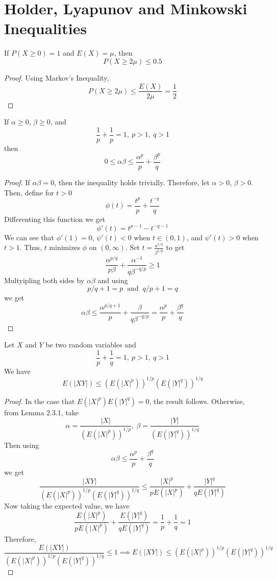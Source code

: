 \section{Holder, Lyapunov and Minkowski Inequalities}
\begin{corollary}
    If $P(X \geq 0) = 1$ and $E(X) = \mu$, then 
    \[P(X \geq 2\mu) \leq 0.5\]
\end{corollary}
\begin{proof}
    Using Markov's Inequality, 
    \[P(X \geq 2\mu) \leq \frac{E(X)}{2\mu} = \frac{1}{2}\]
\end{proof}
\begin{lemma}
    If $\alpha \geq 0$, $\beta \geq 0$, and
    \[\frac{1}{p} + \frac{1}{p} = 1, \ p>1, \ q > 1\]
    then 
    \[0 \leq \alpha \beta \leq \frac{\alpha^p}{p} + \frac{\beta^p}{q}\]
\end{lemma}
\begin{proof}
    If $\alpha\beta=0$, then the inequality holds trivially. Therefore, let $\alpha > 0$, $\beta > 0$. Then, define for $t > 0$
    \[\phi(t) = \frac{t^p}{p} + \frac{t^{-q}}{q}\]
    Differenting this function we get 
    \[\phi'(t) = t^{p-1} - t^{-q-1}\]
    We can see that $\phi'(1) = 0$, $\psi'(t) < 0$ when $t \in (0,1)$, and $\psi'(t) > 0$ when $t > 1$. Thus, $t$ minimizes $\phi$ on $(0,\infty)$. Set $t = \frac{a^{1/q}}{\beta^{1/p}}$ to get 
    \[\frac{\alpha^{p/q}}{p\beta} + \frac{\alpha^{-1}}{q\beta^{-q/p}} \geq 1\]
    Multyipling both sides by $\alpha\beta$ and using 
    \[p/q + 1 = p \ \text{ and } \ q/p + 1 = q\]
    we get
    \[\alpha\beta \leq \frac{\alpha^{p/q+1}}{p} + \frac{\beta}{q\beta^{-q/p}} = \frac{\alpha^p}{p} + \frac{\beta^q}{q}\]
\end{proof}
\begin{theorem}
    Let $X$ and $Y$ be two random variables and 
    \[\frac{1}{p} + \frac{1}{q} = 1, \ p > 1, \ q > 1\]
    We have 
    \[E(|XY|) \leq (E(|X|^p))^{1/p}(E(|Y|^q))^{1/q}\]
\end{theorem}
\begin{proof}
    In the case that $E(|X|^p)E(|Y|^q) = 0$, the result follows. Otherwise, from Lemma 2.3.1, take 
    \[\alpha = \frac{|X|}{(E(|X|^p))^{1/p}}, \ \beta = \frac{|Y|}{(E(|Y|^q))^{1/q}}\]
    Then using 
    \[\alpha\beta \leq \frac{\alpha^p}{p} + \frac{\beta^q}{q}\]
    we get
    \[\frac{|XY|}{(E(|X|^p))^{1/p}(E(|Y|^q))^{1/q}} \leq \frac{|X|^p}{pE(|X|^p)} + \frac{|Y|^q}{qE(|Y|^q)}\]
    Now taking the expected value, we have
    \[\frac{E(|X|^p)}{pE(|X|^p)} + \frac{E(|Y|^q)}{qE(|Y|^q)} = \frac{1}{p} + \frac{1}{q} = 1\]
    Therefore,
    \[\frac{E(|XY|)}{(E(|X|^p))^{1/p}(E(|Y|^q))^{1/q}} \leq 1 \implies E(|XY|) \leq (E(|X|^p))^{1/p}(E(|Y|^q))^{1/q}\]
\end{proof}
